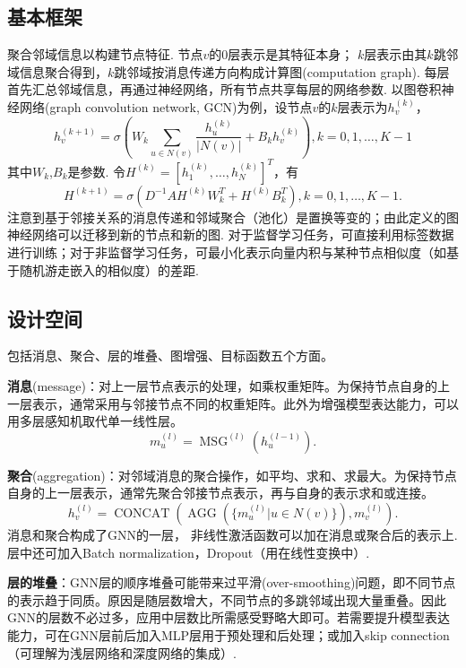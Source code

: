 \subsection{基本框架}
\par 聚合邻域信息以构建节点特征. 节点$v$的0层表示是其特征本身； $k$层表示由其$k$跳邻域信息聚合得到，$k$跳邻域按消息传递方向构成计算图(computation graph). 每层首先汇总邻域信息，再通过神经网络，所有节点共享每层的网络参数. 以图卷积神经网络(graph convolution network, GCN)为例，设节点$v$的$k$层表示为$h_v^{(k)}$，
\begin{equation}
    h_v^{(k+1)}=\sigma(W_k\sum_{u\in N(v)}\frac{h_u^{(k)}}{\vert N(v)\vert}+B_k h_v^{(k)}), k=0,1,\dots,K-1
\end{equation}
其中$W_k$,$B_k$是参数. 令$H^{(k)}=[h_1^{(k)},\dots, h_N^{(k)}]^T$，有
\begin{equation}
    H^{(k+1)}=\sigma(D^{-1}AH^{(k)}W_k^T+H^{(k)}B_k^T), k=0,1,\dots,K-1.
\end{equation}
注意到基于邻接关系的消息传递和邻域聚合（池化）是置换等变的；由此定义的图神经网络可以迁移到新的节点和新的图. 对于监督学习任务，可直接利用标签数据进行训练；对于非监督学习任务，可最小化表示向量内积与某种节点相似度（如基于随机游走嵌入的相似度）的差距.

\subsection{设计空间}
\par 包括消息、聚合、层的堆叠、图增强、目标函数五个方面。
\par \textbf{消息}(message)：对上一层节点表示的处理，如乘权重矩阵。为保持节点自身的上一层表示，通常采用与邻接节点不同的权重矩阵。此外为增强模型表达能力，可以用多层感知机取代单一线性层。
\begin{equation}
    m_u^{(l)}=\operatorname{MSG}^{(l)}(h_u^{(l-1)}).
\end{equation}
\par \textbf{聚合}(aggregation)：对邻域消息的聚合操作，如平均、求和、求最大。为保持节点自身的上一层表示，通常先聚合邻接节点表示，再与自身的表示求和或连接。
\begin{equation}
    h_v^{(l)}=\operatorname{CONCAT}(\operatorname{AGG}(\{m_u^{(l)}\vert u\in N(v)\}), m_v^{(l)}).
\end{equation}
消息和聚合构成了GNN的一层， 非线性激活函数可以加在消息或聚合后的表示上. 层中还可加入Batch normalization，Dropout（用在线性变换中）.
\par \textbf{层的堆叠}：GNN层的顺序堆叠可能带来过平滑(over-smoothing)问题，即不同节点的表示趋于同质。原因是随层数增大，不同节点的多跳邻域出现大量重叠。因此GNN的层数不必过多，应用中层数比所需感受野略大即可。若需要提升模型表达能力，可在GNN层前后加入MLP层用于预处理和后处理；或加入skip connection（可理解为浅层网络和深度网络的集成）.

